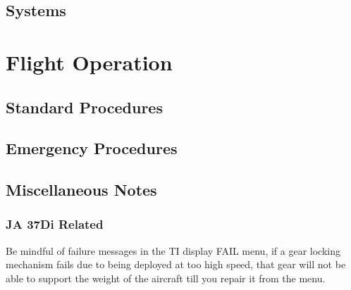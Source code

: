 \chapter{Systems}



\part{Flight Operation}
\chapter{Standard Procedures}
\chapter{Emergency Procedures}
\chapter{Miscellaneous Notes}
\section{JA 37Di Related}
Be mindful of failure messages in the TI display FAIL menu, if a gear locking mechanism fails due to being deployed at too high speed, that gear will not be able to support the weight of the aircraft till you repair it from the menu.

